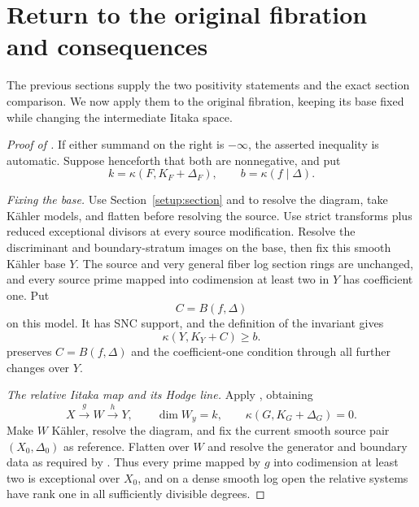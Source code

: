 \section{Return to the original fibration and consequences}
\label{application:section}

The previous sections supply the two positivity statements and the
exact section comparison. We now apply them to the original fibration,
keeping its base fixed while changing the intermediate Iitaka space.

\begin{proof}[Proof of ]
If either summand on the right is \(-\infty\), the asserted inequality
is automatic.  Suppose henceforth that both are nonnegative, and put
\[
 k=\kappa(F,K_F+\Delta_F),\qquad b=\kappa(f\mid\Delta).
\]

\smallskip\noindent
\emph{Fixing the base.}
Use Section~\ref{setup:section} and  to resolve the diagram,
take K\"ahler models, and flatten before resolving the source. Use
strict transforms plus reduced exceptional divisors at every source
modification. Resolve the discriminant and boundary-stratum images
on the base, then fix this smooth K\"ahler base \(Y\). The source
and very general fiber log section rings are unchanged, and every
source prime mapped into codimension at least two in \(Y\) has
coefficient one. Put
\[
 C=B(f,\Delta)
\]
on this model. It has SNC support, and the definition of the invariant
gives
\begin{equation}
 \kappa(Y,K_Y+C)\geq b.
 \label{application:invariant-bound}
\end{equation}
 preserves \(C=B(f,\Delta)\) and the
coefficient-one condition through all further changes over \(Y\).

\smallskip\noindent
\emph{The relative Iitaka map and its Hodge line.}
Apply , obtaining
\[
 X\xrightarrow{g}W\xrightarrow{h}Y,
 \qquad \dim W_y=k,
 \qquad \kappa(G,K_G+\Delta_G)=0.
\]
Make \(W\) K\"ahler, resolve the diagram, and fix the current smooth
source pair \((X_0,\Delta_0)\) as reference. Flatten over \(W\)
and resolve the generator and boundary data as required by
. Thus every prime mapped by \(g\) into
codimension at least two is exceptional over \(X_0\), and on a dense
smooth log open the relative
systems have rank one in all sufficiently divisible degrees.


\end{proof}
